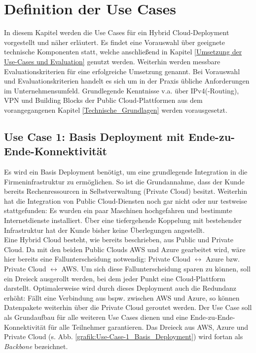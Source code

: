 \chapter{Definition der Use Cases} \label{Defintion der Use-Cases}
In diesem Kapitel werden die Use Cases für ein Hybrid Cloud-\gls{Deployment} vorgestellt und näher erläutert. Es findet eine Vorauswahl über geeignete technische Komponenten statt, welche anschließend in Kapitel \ref{Umsetzung der Use-Cases und Evaluation} genutzt werden. Weiterhin werden messbare Evaluationskriterien für eine erfolgreiche Umsetzung genannt. Bei Vorauswahl und Evaluationskriterien handelt es sich um in der Praxis übliche Anforderungen im Unternehmensumfeld. Grundlegende Kenntnisse v.a. über IPv4(-Routing), \gls{VPN} und Building Blocks der Public Cloud-Plattformen aus dem vorangegangenen Kapitel \ref{Technische_Grundlagen} werden vorausgesetzt.

\section{Use Case 1: Basis Deployment mit Ende-zu-Ende-Konnektivität}\label{base-deployment}
Es wird ein Basis \gls{Deployment} benötigt, um eine grundlegende Integration in die Firmeninfrastruktur zu ermöglichen. So ist die Grundannahme, dass der Kunde bereits Rechenressourcen in Selbstverwaltung (\glqq Private Cloud\grqq{}) besitzt. Weiterhin hat die Integration von Public Cloud-Diensten noch gar nicht oder nur testweise stattgefunden: Es wurden ein paar Maschinen hochgefahren und bestimmte Internetdienste installiert. Über eine tiefergehende Koppelung mit bestehender Infrastruktur hat der Kunde bisher keine Überlegungen angestellt.\\
Eine Hybrid Cloud besteht, wie bereits beschrieben, aus Public und Private Cloud. Da mit den beiden Public Clouds AWS und Azure gearbeitet wird, wäre hier bereits eine Fallunterscheidung notwendig: Private Cloud $\leftrightarrow$ Azure bzw. Private Cloud $\leftrightarrow$ AWS. Um sich diese Fallunterscheidung sparen zu können, soll ein Dreieck ausgerollt werden, bei dem jeder Punkt eine Cloud-Plattform darstellt.
Optimalerweise wird durch dieses \gls{Deployment} auch die Redundanz erhöht: Fällt eine Verbindung aus bspw. zwischen AWS und Azure, so können Datenpakete weiterhin über die Private Cloud geroutet werden.
Der Use Case soll als Grundaufbau für alle weiteren Use Cases dienen und eine Ende-zu-Ende-Konnektivität für alle Teilnehmer garantieren. Das Dreieck aus AWS, Azure und Private Cloud (s. Abb. \ref{grafik:Use-Case-1_Basis_Deployment}) wird fortan als \textit{Backbone} bezeichnet.

